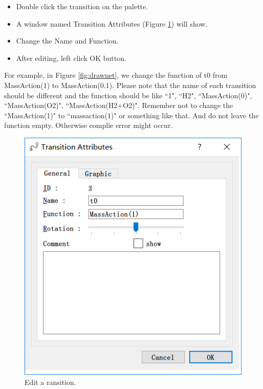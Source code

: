 \documentclass[journal,a4paper,onecolumn]{article}
\begin{document}
\begin{itemize}
	\item Double click the transition on the palette.
	\item A window named Transition Attributes (Figure \ref{fig:edittransition}) will show.
	\item Change the Name and Function.
	\item After editing, left click OK button.
\end{itemize}

For example, in Figure \ref{fig:drawnet}, we change the function of t0 from MassAction(1) to MassAction(0.1). Please note that the name of each transition should be different and the function should be like ``1", ``H2", ``MassAction(0)", ``MassAction(O2)", ``MassAction(H2+O2)". Remember not to change the ``MassAction(1)" to ``massaction(1)" or something like that. And do not leave the function empty. Otherwise complie error might occur.

\begin{figure}[!hbt]
	\begin{center}
		\includegraphics[width=\columnwidth]{fig4}
		\caption{Edit a ransition.}
		\label{fig:edittransition}
	\end{center}
\end{figure}
\end{document}
